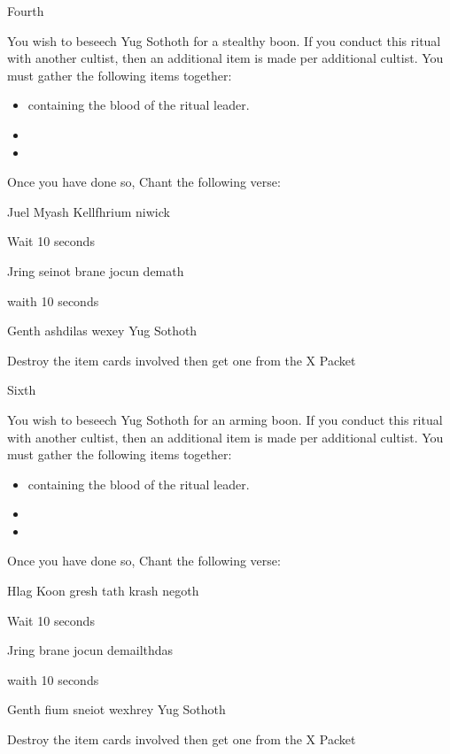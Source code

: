 \documentclass[greennotebook]{guildcamp4} %
\begin{document}
\begin{page}{Fourth}
	
		You wish to beseech Yug Sothoth for a stealthy boon. If you conduct this ritual with another cultist, then an additional item is made per additional cultist. You must gather the following items together: 
		
		\begin{itemize}
			\item \iTestTube{} containing the blood of the ritual leader.
			\item \iGlassLens{}
			\item \iCauldron{}
		\end{itemize}		
		
		Once you have done so, Chant the following verse:
		
		Juel Myash Kellfhrium niwick
		
		Wait 10 seconds
		
		Jring seinot brane jocun demath
		
		waith 10 seconds
		
		Genth ashdilas wexey Yug Sothoth
		
		Destroy the item cards involved then get one \iInvisibilityCloak{} from the X Packet
	
\end{page}

\begin{page}{Sixth}
	
		You wish to beseech Yug Sothoth for an arming boon. If you conduct this ritual with another cultist, then an additional item is made per additional cultist. You must gather the following items together: 
		
		\begin{itemize}
			\item \iTestTube{} containing the blood of the ritual leader.
			\item \iMultitool{}
			\item \iScrapMetal{}
		\end{itemize}		
		
		Once you have done so, Chant the following verse:
		
		Hlag Koon gresh tath krash negoth
		
		Wait 10 seconds
		
		Jring  brane jocun demailthdas
		
		waith 10 seconds
		
		Genth fium sneiot wexhrey Yug Sothoth
		
		Destroy the item cards involved then get one \iCRUpPotion{} from the X Packet

	
\end{page}
\end{document}
